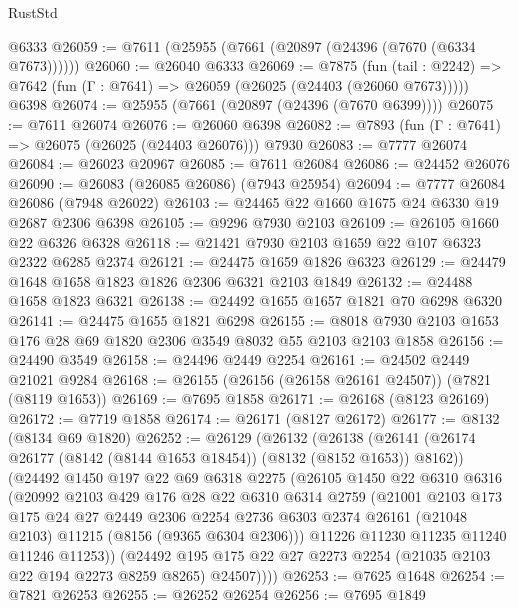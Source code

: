 \begin{lexlean}{RustStd}
\begin{coremodule}
{\begin{coremodule}
{{{{{{{{{{{{{{{{{{{{{{{{{{{{{{{{{{    @6333
@26059 := @7611 (@25955 (@7661 (@20897 (@24396 (@7670 (@6334 @7673))))))
@26060 := @26040 @6333
@26069 := @7875
    (fun (tail : @2242) => @7642 (fun (Γ : @7641) => @26059 (@26025 (@24403 (@26060 @7673)))))
    @6398
@26074 := @25955 (@7661 (@20897 (@24396 (@7670 @6399))))
@26075 := @7611 @26074
@26076 := @26060 @6398
@26082 := @7893 (fun (Γ : @7641) => @26075 (@26025 (@24403 @26076))) @7930
@26083 := @7777 @26074
@26084 := @26023 @20967
@26085 := @7611 @26084
@26086 := @24452 @26076
@26090 := @26083 (@26085 @26086) (@7943 @25954)
@26094 := @7777 @26084 @26086 (@7948 @26022)
@26103 := @24465 @22 @1660 @1675 @24 @6330 @19 @2687 @2306 @6398
@26105 := @9296 @7930 @2103
@26109 := @26105 @1660 @22 @6326 @6328
@26118 := @21421 @7930 @2103 @1659 @22 @107 @6323 @2322 @6285 @2374
@26121 := @24475 @1659 @1826 @6323
@26129 := @24479 @1648 @1658 @1823 @1826 @2306 @6321 @2103 @1849
@26132 := @24488 @1658 @1823 @6321
@26138 := @24492 @1655 @1657 @1821 @70 @6298 @6320
@26141 := @24475 @1655 @1821 @6298
@26155 := @8018 @7930 @2103 @1653 @176 @28 @69 @1820 @2306 @3549 @8032 @55 @2103 @2103 @1858
@26156 := @24490 @3549
@26158 := @24496 @2449 @2254
@26161 := @24502 @2449 @21021 @9284
@26168 := @26155 (@26156 (@26158 @26161 @24507)) (@7821 (@8119 @1653))
@26169 := @7695 @1858
@26171 := @26168 (@8123 @26169)
@26172 := @7719 @1858
@26174 := @26171 (@8127 @26172)
@26177 := @8132 (@8134 @69 @1820)
@26252 := @26129
    (@26132
      (@26138
        (@26141 (@26174 @26177 (@8142 (@8144 @1653 @18454)) (@8132 (@8152 @1653)) @8162))
        (@24492
          @1450
          @197
          @22
          @69
          @6318
          @2275
          (@26105
            @1450
            @22
            @6310
            @6316
            (@20992
              @2103
              @429
              @176
              @28
              @22
              @6310
              @6314
              @2759
              (@21001
                @2103
                @173
                @175
                @24
                @27
                @2449
                @2306
                @2254
                @2736
                @6303
                @2374
                @26161
                (@21048 @2103)
                @11215
                (@8156 (@9365 @6304 @2306)))
              @11226
              @11230
              @11235
              @11240
              @11246
              @11253))
          (@24492 @195 @175 @22 @27 @2273 @2254 (@21035 @2103 @22 @194 @2273 @8259 @8265) @24507))))
@26253 := @7625 @1648
@26254 := @7821 @26253
@26255 := @26252 @26254
@26256 := @7695 @1849
}}}}}}}}}}}}}}}}}}}}}}}}}}}}}}}}}}
\end{coremodule}}
\end{coremodule}
\end{lexlean}
